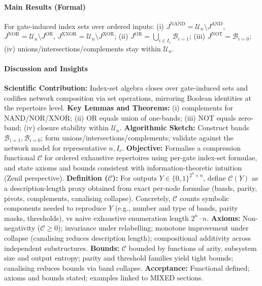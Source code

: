 \paragraph{Main Results (Formal)}
\begin{theorem}
For gate-induced index sets over ordered inputs: (i) \(J^{\mathrm{NAND}}=\mathcal{U}_n\setminus J^{\mathrm{AND}}\), \(J^{\mathrm{NOR}}=\mathcal{U}_n\setminus J^{\mathrm{OR}}\), \(J^{\mathrm{XNOR}}=\mathcal{U}_n\setminus J^{\mathrm{XOR}}\); (ii) \(J^{\mathrm{OR}}=\bigcup_{i\in I_c}\mathcal{B}_{i=1}\); (iii) \(J^{\mathrm{NOT}}=\mathcal{B}_{i=0}\); (iv) unions/intersections/complements stay within \(\mathcal{U}_n\).
\end{theorem}
\paragraph{Discussion and Insights}
\textbf{Scientific Contribution:} Index-set algebra closes over gate-induced sets and codifies network composition via set operations, mirroring Boolean identities at the repertoire level.
\textbf{Key Lemmas and Theorems:} (i) complements for NAND/NOR/XNOR; (ii) OR equals union of one-bands; (iii) NOT equals zero-band; (iv) closure stability within \(\mathcal{U}_n\).
\textbf{Algorithmic Sketch:} Construct bands \(\mathcal{B}_{i=1}, \mathcal{B}_{i=0}\); form unions/intersections/complements; validate against the network model for representative \(n,I_c\).
\textbf{Objective:} Formalise a compression functional \(\mathcal{C}\) for ordered exhaustive repertoires using per-gate index-set formulae, and state axioms and bounds consistent with information-theoretic intuition (Zenil perspective).
\textbf{Definition (\(\mathcal{C}\)):} For outputs \(Y\in\{0,1\}^{2^n\times n}\), define \(\mathcal{C}(Y)\) as a description-length proxy obtained from exact per-node formulae (bands, parity, pivots, complements, canalising collapse). Concretely, \(\mathcal{C}\) counts symbolic components needed to reproduce \(Y\) (e.g., number and type of bands, parity masks, thresholds), vs naive exhaustive enumeration length \(2^n\cdot n\).
\textbf{Axioms:} Non-negativity (\(\mathcal{C}\ge 0\)); invariance under relabelling; monotone improvement under collapse (canalising reduces description length); compositional additivity across independent substructures.
\textbf{Bounds:} \(\mathcal{C}\) bounded by functions of arity, subsystem size and output entropy; parity and threshold families yield tight bounds; canalising reduces bounds via band collapse.
\textbf{Acceptance:} Functional defined; axioms and bounds stated; examples linked to MIXED sections.
